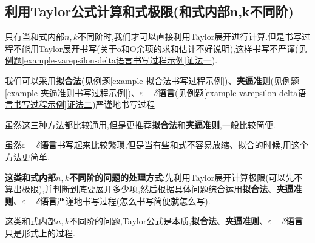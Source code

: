 \documentclass[../../main.tex]{subfiles}%
\begin{document}
\subsection{利用Taylor公式计算和式极限(和式内部n,k不同阶)}

只有当和式内部$n,k$不同阶时,我们才可以直接利用Taylor展开进行计算.但是书写过程不能用Taylor展开书写(关于o和O余项的求和估计不好说明),这样书写不严谨(见\hyperref[example-varepsilon-delta语言书写过程示例]{例题\ref{example-varepsilon-delta语言书写过程示例}证法一}).

我们可以采用\textbf{拟合法}(见\hyperref[example-拟合法书写过程示例]{例题\ref{example-拟合法书写过程示例}})、\textbf{夹逼准则}(见\hyperref[example-夹逼准则书写过程示例]{例题\ref{example-夹逼准则书写过程示例}})、\textbf{$\varepsilon-\delta$语言}(见\hyperref[example-varepsilon-delta语言书写过程示例]{例题\ref{example-varepsilon-delta语言书写过程示例}证法二})严谨地书写过程

\begin{note}
虽然这三种方法都比较通用,但是更推荐\textbf{拟合法}和\textbf{夹逼准则},一般比较简便.

虽然\textbf{$\varepsilon-\delta$语言}书写起来比较繁琐,但是当有些和式不容易放缩、拟合的时候,用这个方法更简单.
\end{note}

\textbf{这类和式内部$n,k$不同阶的问题的处理方式}:先利用Taylor展开计算极限(可以先不算出极限),并判断到底要展开多少项,然后根据具体问题综合运用\textbf{拟合法}、\textbf{夹逼准则}、\textbf{$\varepsilon-\delta$语言}严谨地书写过程(怎么书写简便就怎么写).

\begin{remark}
这类和式内部$n,k$不同阶的问题,Taylor公式是本质,\textbf{拟合法}、\textbf{夹逼准则}、\textbf{$\varepsilon-\delta$语言}只是形式上的过程.
\end{remark}
\end{document}
